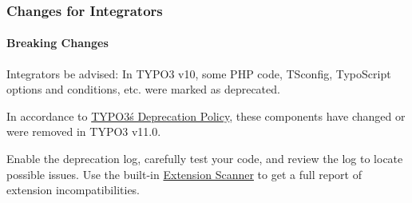 %

\begin{frame}[fragile]
	\frametitle{Changes for Integrators}
	\framesubtitle{Breaking Changes}

	\small
		Integrators be advised: In TYPO3 v10, some PHP code, TSconfig, TypoScript
		options and conditions, etc. were marked as deprecated.

		\vspace{0.2cm}

		In accordance to
		\href{https://typo3.org/article/typo3-deprecation-policy}{TYPO3\'s Deprecation Policy},
		these components have changed or were removed in TYPO3 v11.0.

		\vspace{0.2cm}

		Enable the deprecation log, carefully test your code, and review the log
		to locate possible issues. Use the built-in
		\href{https://docs.typo3.org/m/typo3/reference-coreapi/master/en-us/ApiOverview/ExtensionScanner/Index.html}{Extension Scanner}
		to get a full report of extension incompatibilities.

	\normalsize

\end{frame}

